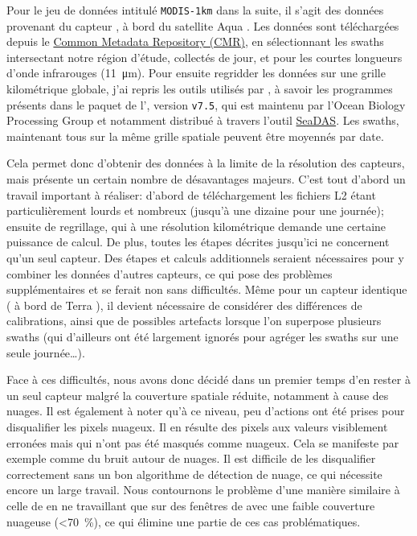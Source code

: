 \documentclass[index]{subfiles}
\begin{document}
Pour le jeu de données intitulé \verb|MODIS-1km| dans la suite, il s'agit des données provenant du capteur , à bord du satellite Aqua \parencite{kilpatrick_2015}.
Les données sont téléchargées depuis le \href{https://cmr.earthdata.nasa.gov/search/}{Common Metadata Repository (CMR)}, en sélectionnant les swaths intersectant notre région d'étude, collectés de jour, et pour les courtes longueurs d'onde infrarouges (\qty{11}{\um}).
Pour ensuite regridder les données sur une grille kilométrique globale, j'ai repris les outils utilisés par \textcite{liu_2016}, à savoir les programmes présents dans le paquet de l'\href{https://oceandata.sci.gsfc.nasa.gov/ocssw}{}, version \verb|v7.5|, qui est maintenu par l'Ocean Biology Processing Group et notamment distribué à travers l'outil \href{https://seadas.gsfc.nasa.gov/}{SeaDAS}.
Les swaths, maintenant tous sur la même grille spatiale peuvent être moyennés par date.

Cela permet donc d'obtenir des données à la limite de la résolution des capteurs, mais présente un certain nombre de désavantages majeurs.
C'est tout d'abord un travail important à réaliser: d'abord de téléchargement les fichiers L2 étant particulièrement lourds et nombreux (jusqu'à une dizaine pour une journée); ensuite de regrillage, qui à une résolution kilométrique demande une certaine puissance de calcul.
De plus, toutes les étapes décrites jusqu'ici ne concernent qu'un seul capteur.
Des étapes et calculs additionnels seraient nécessaires pour y combiner les données d'autres capteurs, ce qui pose des problèmes supplémentaires et se ferait non sans difficultés.
Même pour un capteur identique ( à bord de Terra ), il devient nécessaire de considérer des différences de calibrations, ainsi que de possibles artefacts lorsque l'on superpose plusieurs swaths (qui d'ailleurs ont été largement ignorés pour agréger les swaths sur une seule journée\dots).

Face à ces difficultés, nous avons donc décidé dans un premier temps d'en rester à un seul capteur malgré la couverture spatiale réduite, notamment à cause des nuages.
Il est également à noter qu'à ce niveau, peu d'actions ont été prises pour disqualifier les pixels nuageux.
Il en résulte des pixels aux valeurs visiblement erronées mais qui n'ont pas été masqués comme nuageux.
Cela se manifeste par exemple comme du bruit autour de nuages.
Il est difficile de les disqualifier correctement sans un bon algorithme de détection de nuage, ce qui nécessite encore un large travail.
Nous contournons le problème d'une manière similaire à celle de \textcite{liu_2016} en ne travaillant que sur des fenêtres de  avec une faible couverture nuageuse (\textless\qty{70}{\percent}), ce qui élimine une partie de ces cas problématiques.
\end{document}

